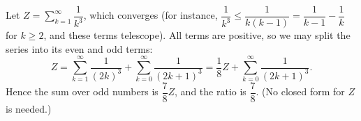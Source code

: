 Let $Z=\sum_{k=1}^{\infty}\dfrac{1}{k^3}$, which converges (for instance, $\dfrac{1}{k^3}\le\dfrac{1}{k(k-1)}=\dfrac{1}{k-1}-\dfrac{1}{k}$ for $k\ge2$, and these terms telescope). All terms are positive, so we may split the series into its even and odd terms:
\[
Z=\sum_{k=1}^{\infty}\dfrac{1}{(2k)^3}+\sum_{k=0}^{\infty}\dfrac{1}{(2k+1)^3}=\dfrac{1}{8}Z+\sum_{k=0}^{\infty}\dfrac{1}{(2k+1)^3}.
\]
Hence the sum over odd numbers is $\dfrac{7}{8}Z$, and the ratio is $\boxed{\dfrac{7}{8}}$. (No closed form for $Z$ is needed.)
